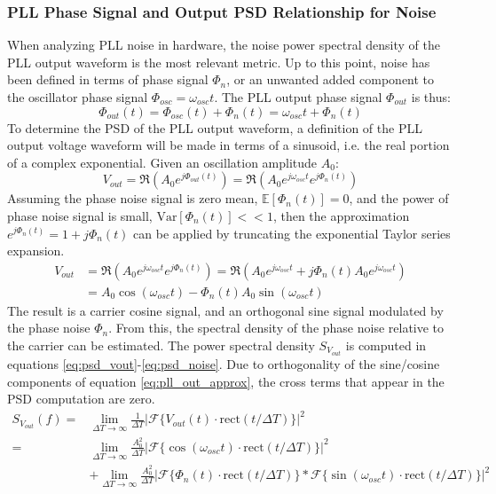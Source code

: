 \subsubsection{PLL Phase Signal and Output PSD Relationship for Noise}\label{pn_noise_psd}
	When analyzing PLL noise in hardware, the noise power spectral density of the PLL output waveform is the most relevant metric. Up to this point, noise has been defined in terms of phase signal $\Phi_{n}$, or an unwanted added component to the oscillator phase signal $\Phi_{osc}=\omega_{osc}t$. The PLL output phase signal $\Phi_{out}$ is thus:
	\begin{equation}
		\Phi_{out}(t) = \Phi_{osc}(t) + \Phi_{n}(t) = \omega_{osc}t + \Phi_{n}(t) 
	\end{equation}
	To determine the PSD of the PLL output waveform, a definition of the PLL output voltage waveform will be made in terms of a sinusoid, i.e. the real portion of a complex exponential. Given an oscillation amplitude $A_0$:
	\begin{equation}
		V_{out} = \Re\left(A_0e^{j\Phi_{out}(t)}\right) = \Re\left(A_0e^{j\omega_{osc}t}e^{j\Phi_{n}(t)}\right)
	\end{equation}
	Assuming the phase noise signal is zero mean, $\mathbb{E}[\Phi_{n}(t)]=0$, and the power of phase noise signal is small, $\mathrm{Var}[\Phi_{n}(t)] << 1$, then the approximation $e^{j\Phi_{n}(t)} = 1 + j\Phi_{n}(t)$ can be applied by truncating the exponential Taylor series expansion.
	\begin{align}
		V_{out} &= \Re\left(A_0e^{j\omega_{osc}t}e^{j\Phi_{n}(t)}\right) = \Re\left(A_0e^{j\omega_{osc}t} +j\Phi_{n}(t)A_0e^{j\omega_{osc}t}\right)\\
		&= A_0\cos(\omega_{osc}t) - \Phi_{n}(t)A_0\sin(\omega_{osc}t) \label{eq:pll_out_approx}
	\end{align}
	The result is a carrier cosine signal, and an orthogonal sine signal modulated by the phase noise $\Phi_{n}$. From this, the spectral density of the phase noise relative to the carrier can be estimated. The power spectral density $S_{V_{out}}$ is computed in equations \ref{eq:psd_vout}-\ref{eq:psd_noise}. Due to orthogonality of the sine/cosine components of equation \ref{eq:pll_out_approx}, the cross terms that appear in the PSD computation are zero. 
	\begin{align}
		S_{V_{out}}(f) =& \lim_{\Delta T\rightarrow\infty}\frac{1}{\Delta T}|\mathcal{F}\{V_{out}(t)\cdot\mathrm{rect}(t/\Delta T)\}|^2 \label{eq:psd_vout}\\
		=&\lim_{\Delta T\rightarrow\infty}\frac{A_0^2}{\Delta T}|\mathcal{F}\{\cos(\omega_{osc}t)\cdot\mathrm{rect}(t/\Delta T)\}|^2 \label{eq:psd_carrier}\\ 
		&+ \lim_{\Delta T\rightarrow\infty}\frac{A_0^2}{\Delta T}|\mathcal{F}\{\Phi_{n}(t)\cdot\mathrm{rect}(t/\Delta T)\}*\mathcal{F}\{\sin(\omega_{osc}t)\cdot\mathrm{rect}(t/\Delta T)\}|^2 \label{eq:psd_noise}
	\end{align}
